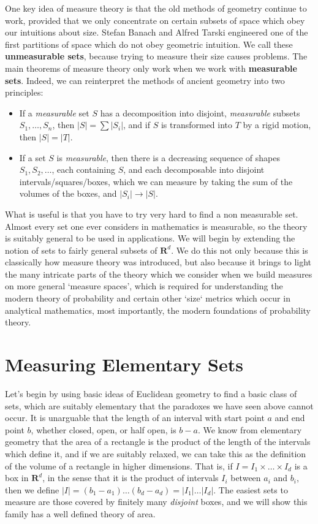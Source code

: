%
One key idea of measure theory is that the old methods of geometry continue to work, provided that we only concentrate on certain subsets of space which obey our intuitions about size. Stefan Banach and Alfred Tarski engineered one of the first partitions of space which do not obey geometric intuition. We call these {\bf unmeasurable sets}, because trying to measure their size causes problems. The main theorems of measure theory only work when we work with {\bf measurable sets}. Indeed, we can reinterpret the methods of ancient geometry into two principles:
%
\begin{itemize}
    \item If a {\it measurable} set $S$ has a decomposition into disjoint, {\it measurable} subsets $S_1, \dots, S_n$, then $|S| = \sum |S_i|$, and if $S$ is transformed into $T$ by a rigid motion, then $|S| = |T|$.

    \item If a set $S$ is {\it measurable}, then there is a decreasing sequence of shapes $S_1, S_2, \dots$, each containing $S$, and each decomposable into disjoint intervals/squares/boxes, which we can measure by taking the sum of the volumes of the boxes, and $|S_i| \to |S|$.
\end{itemize}
%
What is useful is that you have to try very hard to find a non measurable set. Almost every set one ever considers in mathematics is measurable, so the theory is suitably general to be used in applications. We will begin by extending the notion of sets to fairly general subsets of $\mathbf{R}^d$. We do this not only because this is classically how measure theory was introduced, but also because it brings to light the many intricate parts of the theory which we consider when we build measures on more general `measure spaces', which is required for understanding the modern theory of probability and certain other `size` metrics which occur in analytical mathematics, most importantly, the modern foundations of probability theory.

\section{Measuring Elementary Sets}

Let's begin by using basic ideas of Euclidean geometry to find a basic class of sets, which are suitably elementary that the paradoxes we have seen above cannot occur. It is unarguable that the length of an interval with start point $a$ and end point $b$, whether closed, open, or half open, is $b - a$. We know from elementary geometry that the area of a rectangle is the product of the length of the intervals which define it, and if we are suitably relaxed, we can take this as the definition of the volume of a rectangle in higher dimensions. That is, if $I = I_1 \times \dots \times I_d$ is a box in $\mathbf{R}^d$, in the sense that it is the product of intervals $I_i$ between $a_i$ and $b_i$, then we define $|I| = (b_1 - a_1) \dots (b_d - a_d) = |I_1| \dots |I_d|$. The easiest sets to measure are those covered by finitely many {\it disjoint} boxes, and we will show this family has a well defined theory of area.

